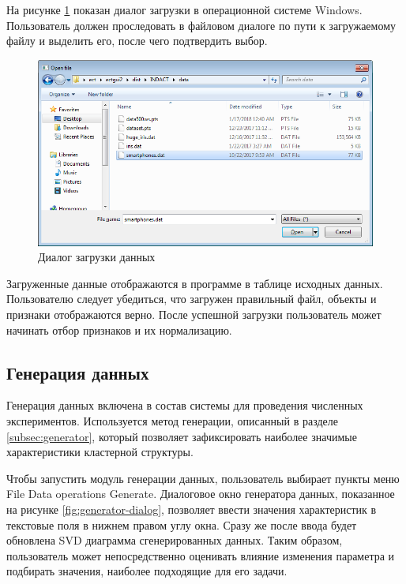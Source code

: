 \documentclass[12pt]{diploma}
\begin{document}
	На рисунке \ref{fig:load-dialog} показан диалог загрузки в операционной системе Windows. Пользователь должен проследовать в файловом диалоге по пути к загружаемому файлу и выделить его, после чего подтвердить выбор.

	\begin{figure}[h!]
		\centering
		\includegraphics[width=0.8\linewidth]{img/instruction/open-smartphones}
		\caption{Диалог загрузки данных}
		\label{fig:load-dialog}
	\end{figure}
	
	Загруженные данные отображаются в программе в таблице исходных данных. Пользователю следует убедиться, что загружен правильный файл, объекты и признаки отображаются верно. После успешной загрузки пользователь может начинать отбор признаков и их нормализацию.
	
	\subsection{Генерация данных}

	Генерация данных включена в состав системы для проведения численных экспериментов. Используется метод генерации, описанный в разделе \ref{subsec:generator}, который позволяет зафиксировать наиболее значимые характеристики кластерной структуры.
	
	Чтобы запустить модуль генерации данных, пользователь выбирает пункты меню File \textrightarrow Data operations  \textrightarrow Generate. Диалоговое окно генератора данных, показанное на рисунке \ref{fig:generator-dialog}, позволяет ввести значения характеристик в текстовые поля в нижнем правом углу окна. Сразу же после ввода будет обновлена SVD диаграмма сгенерированных данных. Таким образом, пользователь может непосредственно оценивать влияние изменения параметра и подбирать  значения, наиболее подходящие для его задачи.
			
\end{document}
